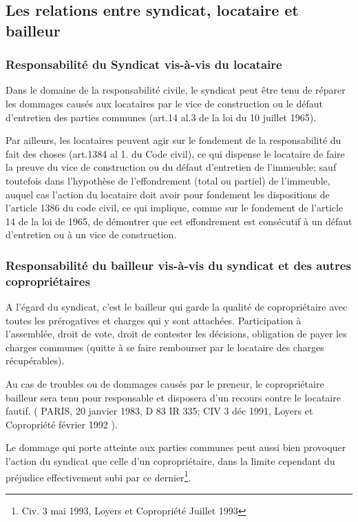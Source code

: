 	\subsection{Les relations entre syndicat, locataire et bailleur}
	
		\subsubsection{Responsabilité du Syndicat vis-à-vis du locataire}
		
			Dans le domaine de la responsabilité civile, le syndicat peut être tenu de réparer les dommages causés aux locataires par le vice de construction ou le défaut d'entretien des parties communes (art.14 al.3 de la loi du 10 juillet 1965).
			
			Par ailleurs, les locataires peuvent agir sur le fondement de la responsabilité du fait des choses (art.1384 al 1. du Code civil), ce qui dispense le locataire de faire la preuve du vice de construction ou du défaut d’entretien de l’immeuble; sauf toutefois dans l’hypothèse de l’effondrement (total ou partiel) de l’immeuble, auquel cas l’action du locataire doit avoir pour fondement les dispositions de l’article 1386 du code civil, ce qui implique, comme sur le fondement de l’article 14 de la loi de 1965, de démontrer que cet effondrement est consécutif à un défaut d’entretien ou à un vice de construction.
		
		\subsubsection{Responsabilité du bailleur vis-à-vis du syndicat et des autres copropriétaires}
		
			A l'égard du syndicat, c'est le bailleur qui garde la qualité de copropriétaire avec toutes les prérogatives et charges qui y sont attachées. Participation à l'assemblée, droit de vote, droit de contester les décisions, obligation de payer les charges communes (quitte à se faire rembourser par le locataire des charges récupérables).
			
			Au cas de troubles ou de dommages causés par le preneur, le copropriétaire bailleur sera tenu pour responsable et disposera d'un recours contre le locataire fautif. ( PARIS, 20 janvier 1983, D 83 IR 335; CIV 3 déc 1991, Loyers et Copropriété février 1992 ).
			
			Le dommage qui porte atteinte aux parties communes peut aussi bien provoquer l'action du syndicat que celle d'un copropriétaire, dans la limite cependant du préjudice effectivement subi par ce dernier\footnote{Civ. 3 mai 1993, Loyers et Copropriété Juillet 1993 }.
		
